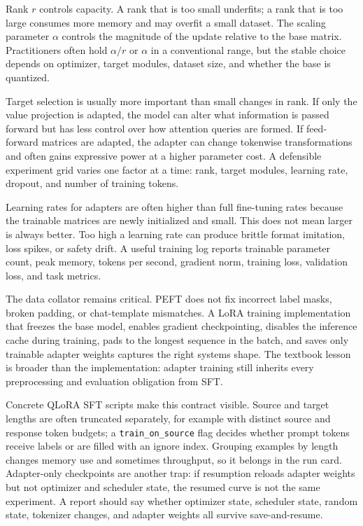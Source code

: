 Rank $r$ controls capacity. A rank that is too small underfits; a rank that is too large consumes more memory and may overfit a small dataset. The scaling parameter $\alpha$ controls the magnitude of the update relative to the base matrix. Practitioners often hold $\alpha/r$ or $\alpha$ in a conventional range, but the stable choice depends on optimizer, target modules, dataset size, and whether the base is quantized.

Target selection is usually more important than small changes in rank. If only the value projection is adapted, the model can alter what information is passed forward but has less control over how attention queries are formed. If feed-forward matrices are adapted, the adapter can change tokenwise transformations and often gains expressive power at a higher parameter cost. A defensible experiment grid varies one factor at a time: rank, target modules, learning rate, dropout, and number of training tokens.

Learning rates for adapters are often higher than full fine-tuning rates because the trainable matrices are newly initialized and small. This does not mean larger is always better. Too high a learning rate can produce brittle format imitation, loss spikes, or safety drift. A useful training log reports trainable parameter count, peak memory, tokens per second, gradient norm, training loss, validation loss, and task metrics.

The data collator remains critical. PEFT does not fix incorrect label masks, broken padding, or chat-template mismatches. A LoRA training implementation that freezes the base model, enables gradient checkpointing, disables the inference cache during training, pads to the longest sequence in the batch, and saves only trainable adapter weights captures the right systems shape. The textbook lesson is broader than the implementation: adapter training still inherits every preprocessing and evaluation obligation from SFT.

Concrete QLoRA SFT scripts make this contract visible. Source and target lengths are often truncated separately, for example with distinct source and response token budgets; a \texttt{train\_on\_source} flag decides whether prompt tokens receive labels or are filled with an ignore index. Grouping examples by length changes memory use and sometimes throughput, so it belongs in the run card. Adapter-only checkpoints are another trap: if resumption reloads adapter weights but not optimizer and scheduler state, the resumed curve is not the same experiment. A report should say whether optimizer state, scheduler state, random state, tokenizer changes, and adapter weights all survive save-and-resume.

